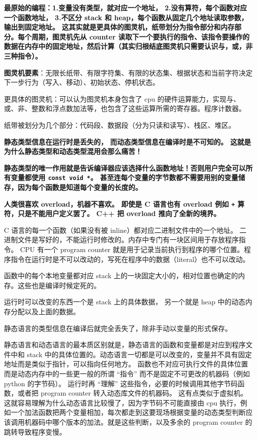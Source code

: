 
\begin{issues}
\issueDraft
\end{issues}

\textbf{最原始的编程：1.变量没有类型，就对应一个地址， 2.没有算符，每个函数对应一个函数地址， 3.不区分 stack 和 heap，每个函数从固定几个地址读取参数，输出到固定地址。 这其实就是更具体的图灵机，纸带划分为指令部分和内存部分。每个周期，图灵机先从 counter 读取下一个要执行的指令、该指令要操作的数据在内存中的固定地址，然后计算（其实归根结底图灵机只需要认识与，或，非三种指令）。}

\textbf{图灵机要素}：无限长纸带、有限字符集、有限的状态集、根据状态和当前字符决定下一步行为（写入、移动）、初始状态、停机状态。

更具体的图灵机：可以认为图灵机本身包含了 cpu 的硬件运算能力，实现与、或、非、整数和浮点数加法等，也包含了这些运算所需的寄存器。程序计数器。

纸带被划分为几个部分：代码段、数据段（分为只读和读写）、栈区、堆区。

\textbf{静态类型信息在运行时是丢失的， 而动态类型信息在编译时是不可知的。 这就是为什么静态类型和动态类型混用会那么痛苦！}

\textbf{静态类型的唯一作用就是告诉编译器应该选择什么函数地址！否则用户完全可以所有变量都使用 \verb`const void *`。 甚至连每个变量的字节数都不需要用别的变量储存，因为每个函数是知道每个变量的长度的。}

\textbf{人类很喜欢 overload，机器不喜欢。 即使是 C 语言也有 overload 例如 \verb`+` 算符，只是不能用户定义罢了。 C++ 把 overload 推向了全新的境界。}

C 语言的每一个函数（如果没有被 inline）都对应二进制文件中的一个地址。 二进制文件是写好的，不能运行时修改的。内存中专门有一块区间用于存放程序指令。 CPU 有一个 program counter 就是用于记录当前执行到程序的哪个位置。程序指令在运行时是不可以改动的，写死在程序中的数据（literal）也不可以改动。

函数中的每个本地变量都对应 stack 上的一块固定大小的，相对位置也确定的内存。这些也是编译时候定死的。

运行时可以改变的东西一个是 stack 上的具体数据， 另一个就是 heap 中的动态内存分配以及上面的数据。

静态语言的类型信息在编译后就完全丢失了，除非手动以变量的形式保存。

静态语言和动态语言的最本质区别就是，静态语言的函数和变量都是对应到程序文件中和 stack 中的具体位置的。动态语言一切都是可以改变的，变量并不具有固定地址而是类似于指针，可以指向任何地方。 函数也不对应可执行文件的具体位置而是动态内存中的一些更一般的所谓 “指令” 而不是固定不可更改的机器码（例如 python 的字节码）。 运行时再 “理解” 这些指令，必要的时候调用其他字节码函数，或者把 program counter 转入动态库文件的机器码。 这有点类似于虚拟机。 这就容易理解为什么动态语言比较慢了，因为字节码不可能直接由 cpu 执行，例如一个加法函数把两个变量相加，每次都走到这要现场根据变量的动态类型判断应该调用机器码中哪个版本的加法。就是这些判断，以及多余的 program counter 的跳转导致程序变慢。

